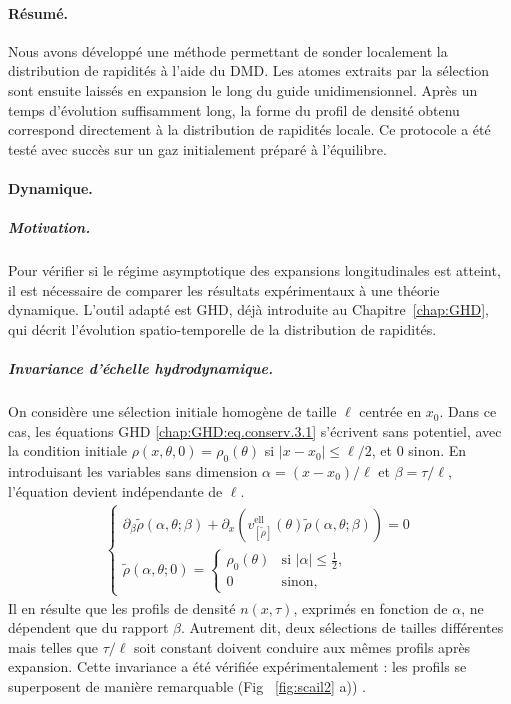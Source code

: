 \paragraph{Résumé.}  
Nous avons développé une méthode permettant de sonder localement la distribution de rapidités à l’aide du \gls{DMD}. Les atomes extraits par la sélection sont ensuite laissés en expansion le long du guide unidimensionnel. Après un temps d’évolution suffisamment long, la forme du profil de densité obtenu correspond directement à la distribution de rapidités locale. Ce protocole a été testé avec succès sur un gaz initialement préparé à l’équilibre.

\paragraph{Dynamique.}
\subparagraph{Motivation.}
Pour vérifier si le régime asymptotique des expansions longitudinales est atteint, il est nécessaire de comparer les résultats expérimentaux à une théorie dynamique. L’outil adapté est \gls{GHD}, déjà introduite au Chapitre~\ref{chap:GHD}, qui décrit l’évolution spatio-temporelle de la distribution de rapidités.

\subparagraph{Invariance d’échelle hydrodynamique.}
On considère une sélection initiale homogène de taille $\ell$ centrée en $x_0$. Dans ce cas, les équations \gls{GHD} \eqref{chap:GHD:eq.conserv.3.1} s’écrivent sans potentiel, avec la condition initiale $\rho(x,\theta,0)=\rho_0(\theta)$ si $|x-x_0|\leq \ell/2$, et $0$ sinon. En introduisant les variables sans dimension $\alpha=(x-x_0)/\ell$ et $\beta=\tau/\ell$, l’équation devient indépendante de $\ell$. 
\begin{eqnarray*}
	\left \{ 
	\begin{array}{rcl}
		\partial_\beta \tilde{\rho} ( \alpha , \theta ; \beta ) +  \partial_x ( v^{\mathrm{ell}}_{[\tilde{\rho}]} (\theta)  \tilde{\rho} ( \alpha , \theta ; \beta )) = 0 \\
		\tilde{\rho} ( \alpha , \theta ; 0 )	 = \begin{cases}
			\rho_0(\theta) & \text{si } |\alpha|\leq \tfrac{1}{2}, \\
			0 & \text{sinon},
		\end{cases}%
	\end{array}
	\right .
\end{eqnarray*}
Il en résulte que les profils de densité $n(x,\tau)$, exprimés en fonction de $\alpha$, ne dépendent que du rapport $\beta$. 
Autrement dit, deux sélections de tailles différentes mais telles que $\tau/\ell$ soit constant doivent conduire aux mêmes profils après expansion. Cette invariance a été vérifiée expérimentalement : les profils se superposent de manière remarquable (Fig ~\ref{fig:scail2} a)) .

